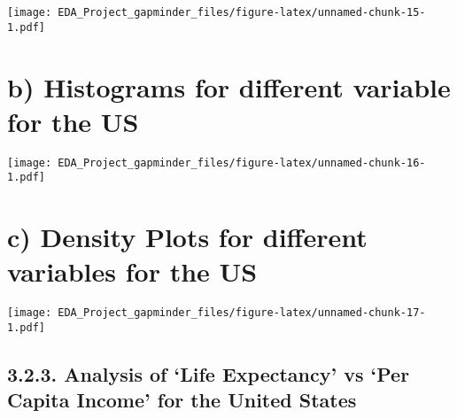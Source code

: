 \documentclass[]{article}
\newenvironment{Shaded}{\begin{snugshade}}{\end{snugshade}}
\newcommand{\KeywordTok}[1]{\textcolor[rgb]{0.13,0.29,0.53}{\textbf{#1}}}
\newcommand{\DataTypeTok}[1]{\textcolor[rgb]{0.13,0.29,0.53}{#1}}
\newcommand{\DecValTok}[1]{\textcolor[rgb]{0.00,0.00,0.81}{#1}}
\newcommand{\StringTok}[1]{\textcolor[rgb]{0.31,0.60,0.02}{#1}}
\newcommand{\OperatorTok}[1]{\textcolor[rgb]{0.81,0.36,0.00}{\textbf{#1}}}
\newcommand{\NormalTok}[1]{#1}
\begin{document}
\texttt{[image: EDA\_Project\_gapminder\_files/figure-latex/unnamed-chunk-15-1.pdf]}

\section{b) Histograms for different variable for the
US}\label{b-histograms-for-different-variable-for-the-us}

\begin{Shaded}
\end{Shaded}

\texttt{[image: EDA\_Project\_gapminder\_files/figure-latex/unnamed-chunk-16-1.pdf]}

\section{c) Density Plots for different variables for the
US}\label{c-density-plots-for-different-variables-for-the-us}

\begin{Shaded}
\end{Shaded}

\texttt{[image: EDA\_Project\_gapminder\_files/figure-latex/unnamed-chunk-17-1.pdf]}

\subsection{\texorpdfstring{3.2.3. Analysis of `Life Expectancy' vs `Per
Capita Income' for the United
States}{3.2.3. Analysis of Life Expectancy vs Per Capita Income for the United States}}\label{analysis-of-life-expectancy-vs-per-capita-income-for-the-united-states}
\end{document}
